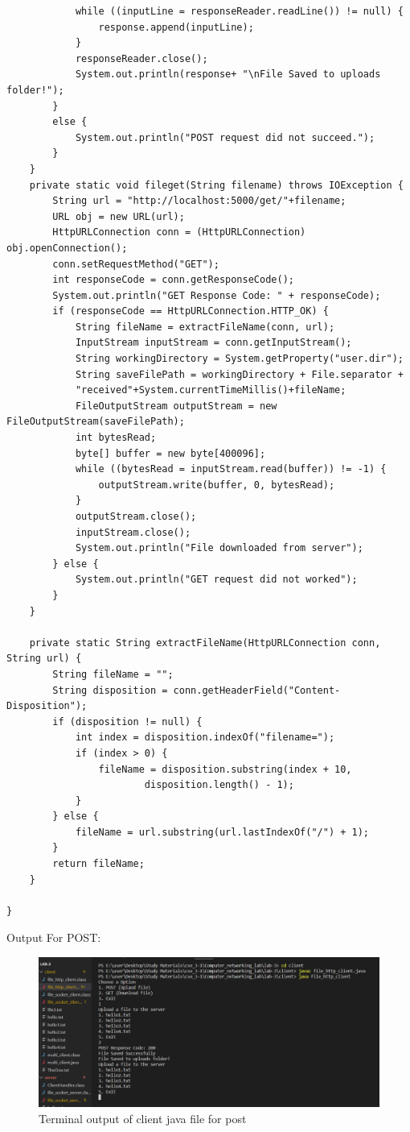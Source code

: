 \documentclass[11pt]{article}
\begin{document}
\begin{verbatim}
            while ((inputLine = responseReader.readLine()) != null) {
                response.append(inputLine);
            }
            responseReader.close();
            System.out.println(response+ "\nFile Saved to uploads folder!");
        }
        else {
            System.out.println("POST request did not succeed.");
        }
    }
    private static void fileget(String filename) throws IOException {
        String url = "http://localhost:5000/get/"+filename;
        URL obj = new URL(url);
        HttpURLConnection conn = (HttpURLConnection) obj.openConnection();
        conn.setRequestMethod("GET");
        int responseCode = conn.getResponseCode();
        System.out.println("GET Response Code: " + responseCode);
        if (responseCode == HttpURLConnection.HTTP_OK) {
            String fileName = extractFileName(conn, url);
            InputStream inputStream = conn.getInputStream();
            String workingDirectory = System.getProperty("user.dir");
            String saveFilePath = workingDirectory + File.separator + 
            "received"+System.currentTimeMillis()+fileName;
            FileOutputStream outputStream = new FileOutputStream(saveFilePath);
            int bytesRead;
            byte[] buffer = new byte[400096];
            while ((bytesRead = inputStream.read(buffer)) != -1) {
                outputStream.write(buffer, 0, bytesRead);
            }
            outputStream.close();
            inputStream.close();
            System.out.println("File downloaded from server");
        } else {
            System.out.println("GET request did not worked");
        }
    }

    private static String extractFileName(HttpURLConnection conn, String url) {
        String fileName = "";
        String disposition = conn.getHeaderField("Content-Disposition");
        if (disposition != null) {
            int index = disposition.indexOf("filename=");
            if (index > 0) {
                fileName = disposition.substring(index + 10,
                        disposition.length() - 1);
            }
        } else {
            fileName = url.substring(url.lastIndexOf("/") + 1);
        }
        return fileName;
    }

}
\end{verbatim}




 Output For POST: 
\begin{figure}[!h]
\centering
\includegraphics[width=\textwidth]{post_client.png}
\caption{Terminal output of client java file for post }
\end{figure}
\FloatBarrier
\end{document}
